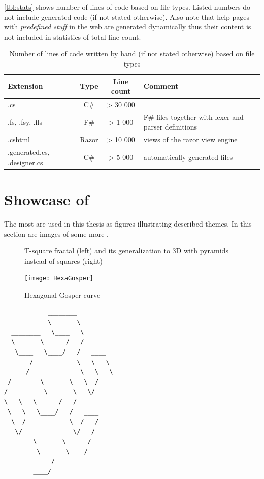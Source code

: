 \autoref{tbl:stats} shows number of lines of code based on file types.
Listed numbers do not include generated code (if not stated otherwise).
Also note that help pages with \emph{predefined stuff} in the web are generated dynamically thus their content is not included in statistics of total line count.


\begin{table}[H]
	\centering
	\begin{tabular}{p{65pt} c c p{200pt}}
   		\toprule
   		Extension & Type & Line count & Comment\\
   		\midrule
		.cs & C\# & > 30 000 &  \\ \hline
		.fs, .fsy, .fls & F\# & > 1 000 & F\# files together with lexer and parser definitions \\ \hline
		.cshtml & Razor & > 10 000 & views of the razor view engine\\ \hline
		.generated.cs, .designer.cs & C\# & > 5 000 & automatically generated files \\
		\bottomrule
	\end{tabular}
	\caption{Number of lines of code written by hand (if not stated otherwise) based on file types}
	\label{tbl:stats}
\end{table}



\section{Showcase of \lsystems}

The most \lsystems are used in this thesis as figures illustrating described themes.
In this section are images of some more \lsystems.

\begin{figure}[H]
	\hfill
	\caption{T-square fractal (left) and its generalization to 3D with pyramids instead of squares (right)}
	\label{fig:rsltTsquares}
\end{figure}

\begin{figure}[p]
	\centering
	\texttt{[image: HexaGosper]}
	\caption{Hexagonal Gosper curve}
	\label{fig:rsltHexaGosper}
\end{figure}

\newsavebox{\lstBoxGosper}
\begin{lrbox}{\lstBoxGosper}
\consolas
\footnotesize
\begin{lstlisting}
            ________          
            \       \         
  ________   \____   \        
  \       \      /   /        
   \____   \____/   /   ____  
       /            \   \   \ 
  ____/   ________   \   \   \
 /        \       \   \  /    
/   ____   \____   \   \/     
\   \   \      /   /          
 \   \   \____/   /   ____    
  \  /            \  /   /    
   \/   ________   \/   /     
        \       \      /      
         \____   \____/       
             /                
        ____/                 
\end{lstlisting}
\end{lrbox}

